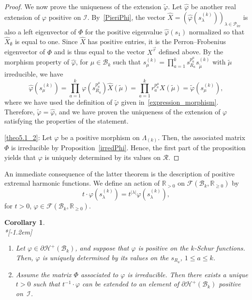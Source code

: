 \documentclass[10pt,a4paper]{amsart}
\newtheorem{coro}[theorem]{Corollary}
\theoremstyle{definition}
\DeclareMathOperator{\irr}{irr}
\begin{document}
\begin{proof}
We now prove the uniqueness of the extension $\widetilde{\varphi}$. Let
$\widehat{\varphi}$ be another real extension of $\varphi$ positive on
$\mathcal{I}$. By~\eqref{PieriPhi}, the vector $\widehat{X}=(\widehat{\varphi
}(s_{\lambda}^{(k)}))_{\lambda\in\mathcal{P}_{\irr }}$ is also a left
eigenvector of $\Phi$ for the positive eigenvalue $\widehat{\varphi}(s_{1})$
normalized so that $\widehat{X}_{\emptyset}$ is equal to one. Since
$\widehat{X}$ has positive entries, it is the Perron--Frobenius eigenvector of
$\Phi$ and is thus equal to the vector $X^{\vec{r}}$ defined above. By the
morphism property of $\widehat{\varphi}$, for $\mu\in\mathcal{B}_{k}$ such
that $s_{\mu}^{(k)}=\prod_{a=1}^{k}s_{R_{a}}^{p_{a}^{\mu}}s_{\widetilde{\mu}%
}^{(k)}$ with $\tilde{\mu}$ irreducible, we have
\begin{equation}
\widehat{\varphi}(s_{\mu}^{(k)})=\prod_{a=1}^{k}\varphi(s_{R_{a}}^{p_{a}^{\mu
}})\widehat{X}(\widetilde{\mu})=\prod_{a=1}^{k}r_{a}^{p_{a}^{\mu}}%
X(\widetilde{\mu})=\widetilde{\varphi}(s_{\mu}^{(k)}),
\end{equation}
where we have used the definition of $\widetilde{\varphi}$ given in~\eqref{expression_morphism}. 
Therefore, $\widetilde{\varphi}=\widehat{\varphi
}$, and we have proven the uniqueness of the extension of $\varphi$ satisfying
the properties of the statement.

\eqref{theo5.1_2}: Let $\varphi$ be a positive morphism on $\Lambda_{(k)}$. Then, the
associated matrix $\Phi$ is irreducible by Proposition~\ref{irredPhi}. Hence,
the first part of the proposition yields that $\varphi$ is uniquely determined
by its values on $\mathcal{R}$.
\end{proof}

An immediate consequence of the latter theorem is the description of positive
extremal harmonic functions. We define an action of $\mathbb{R}_{>0}$ on
$\mathcal{F}(\mathcal{B}_{k},\mathbb{R}_{\geq0})$ by
\[
t\cdot\varphi(s_{\lambda}^{(k)})=t^{\left\vert \lambda\right\vert }%
\varphi(s_{\lambda}^{(k)}),
\]
for $t>0$, $\varphi\in\mathcal{F}(\mathcal{B}_{k},\mathbb{R}_{\geq0})$.

\begin{coro}\ \\*[-1.2em] 

\begin{enumerate}
\item Let $\varphi\in\partial\mathcal{H}^{+}(\mathcal{B}_{k})$, and suppose
that $\varphi$ is positive on the $k$-Schur functions. Then, $\varphi$ is
uniquely determined by its values on the $s_{R_{a}}$, $1\leq a\leq k$.

\item Assume the matrix $\Phi$ associated to $\varphi$ is irreducible. Then
there exists a unique $t>0$ such that $t^{-1}\cdot\varphi$ can be extended to
an element of $\partial\mathcal{H}^{+}(\mathcal{B}_{k})$ positive on~$\mathcal{I}$.
\end{enumerate}
\end{coro}
\end{document}
